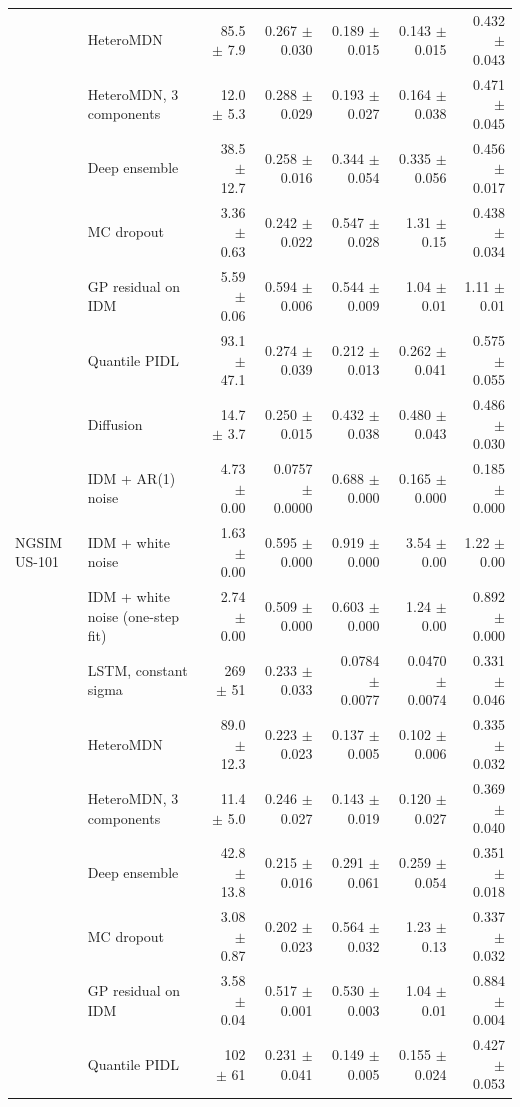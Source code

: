 \begin{longtable}{llrrrrr}
 & HeteroMDN & 85.5 $\pm$ 7.9 & 0.267 $\pm$ 0.030 & 0.189 $\pm$ 0.015 & 0.143 $\pm$ 0.015 & 0.432 $\pm$ 0.043 \\
 & HeteroMDN, 3 components & 12.0 $\pm$ 5.3 & 0.288 $\pm$ 0.029 & 0.193 $\pm$ 0.027 & 0.164 $\pm$ 0.038 & 0.471 $\pm$ 0.045 \\
 & Deep ensemble & 38.5 $\pm$ 12.7 & 0.258 $\pm$ 0.016 & 0.344 $\pm$ 0.054 & 0.335 $\pm$ 0.056 & 0.456 $\pm$ 0.017 \\
 & MC dropout & 3.36 $\pm$ 0.63 & 0.242 $\pm$ 0.022 & 0.547 $\pm$ 0.028 & 1.31 $\pm$ 0.15 & 0.438 $\pm$ 0.034 \\
 & GP residual on IDM & 5.59 $\pm$ 0.06 & 0.594 $\pm$ 0.006 & 0.544 $\pm$ 0.009 & 1.04 $\pm$ 0.01 & 1.11 $\pm$ 0.01 \\
 & Quantile PIDL & 93.1 $\pm$ 47.1 & 0.274 $\pm$ 0.039 & 0.212 $\pm$ 0.013 & 0.262 $\pm$ 0.041 & 0.575 $\pm$ 0.055 \\
 & Diffusion & 14.7 $\pm$ 3.7 & 0.250 $\pm$ 0.015 & 0.432 $\pm$ 0.038 & 0.480 $\pm$ 0.043 & 0.486 $\pm$ 0.030 \\
 & IDM + AR(1) noise & 4.73 $\pm$ 0.00 & 0.0757 $\pm$ 0.0000 & 0.688 $\pm$ 0.000 & 0.165 $\pm$ 0.000 & 0.185 $\pm$ 0.000 \\
\midrule
NGSIM US-101 & IDM + white noise & 1.63 $\pm$ 0.00 & 0.595 $\pm$ 0.000 & 0.919 $\pm$ 0.000 & 3.54 $\pm$ 0.00 & 1.22 $\pm$ 0.00 \\
 & IDM + white noise (one-step fit) & 2.74 $\pm$ 0.00 & 0.509 $\pm$ 0.000 & 0.603 $\pm$ 0.000 & 1.24 $\pm$ 0.00 & 0.892 $\pm$ 0.000 \\
 & LSTM, constant sigma & 269 $\pm$ 51 & 0.233 $\pm$ 0.033 & 0.0784 $\pm$ 0.0077 & 0.0470 $\pm$ 0.0074 & 0.331 $\pm$ 0.046 \\
 & HeteroMDN & 89.0 $\pm$ 12.3 & 0.223 $\pm$ 0.023 & 0.137 $\pm$ 0.005 & 0.102 $\pm$ 0.006 & 0.335 $\pm$ 0.032 \\
 & HeteroMDN, 3 components & 11.4 $\pm$ 5.0 & 0.246 $\pm$ 0.027 & 0.143 $\pm$ 0.019 & 0.120 $\pm$ 0.027 & 0.369 $\pm$ 0.040 \\
 & Deep ensemble & 42.8 $\pm$ 13.8 & 0.215 $\pm$ 0.016 & 0.291 $\pm$ 0.061 & 0.259 $\pm$ 0.054 & 0.351 $\pm$ 0.018 \\
 & MC dropout & 3.08 $\pm$ 0.87 & 0.202 $\pm$ 0.023 & 0.564 $\pm$ 0.032 & 1.23 $\pm$ 0.13 & 0.337 $\pm$ 0.032 \\
 & GP residual on IDM & 3.58 $\pm$ 0.04 & 0.517 $\pm$ 0.001 & 0.530 $\pm$ 0.003 & 1.04 $\pm$ 0.01 & 0.884 $\pm$ 0.004 \\
 & Quantile PIDL & 102 $\pm$ 61 & 0.231 $\pm$ 0.041 & 0.149 $\pm$ 0.005 & 0.155 $\pm$ 0.024 & 0.427 $\pm$ 0.053 \\

\end{longtable}
